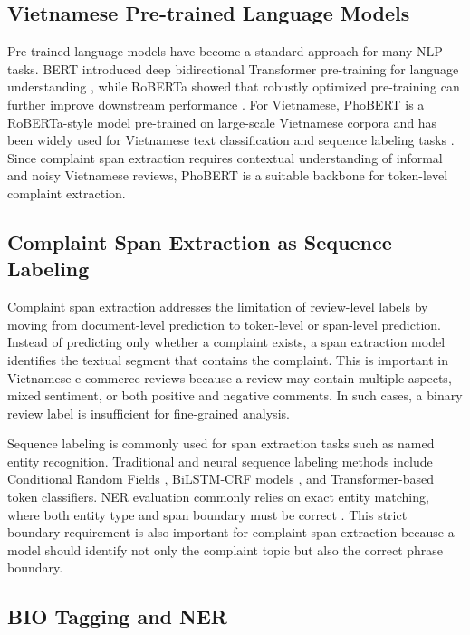 \documentclass[11pt]{article}
\begin{document}
\subsection{Vietnamese Pre-trained Language Models}

Pre-trained language models have become a standard approach for many NLP tasks. BERT introduced deep bidirectional Transformer pre-training for language understanding \citep{bert2019}, while RoBERTa showed that robustly optimized pre-training can further improve downstream performance \citep{roberta2019}. For Vietnamese, PhoBERT is a RoBERTa-style model pre-trained on large-scale Vietnamese corpora and has been widely used for Vietnamese text classification and sequence labeling tasks \citep{phobert2020}. Since complaint span extraction requires contextual understanding of informal and noisy Vietnamese reviews, PhoBERT is a suitable backbone for token-level complaint extraction.

\subsection{Complaint Span Extraction as Sequence Labeling}

Complaint span extraction addresses the limitation of review-level labels by moving from document-level prediction to token-level or span-level prediction. Instead of predicting only whether a complaint exists, a span extraction model identifies the textual segment that contains the complaint. This is important in Vietnamese e-commerce reviews because a review may contain multiple aspects, mixed sentiment, or both positive and negative comments. In such cases, a binary review label is insufficient for fine-grained analysis.

Sequence labeling is commonly used for span extraction tasks such as named entity recognition. Traditional and neural sequence labeling methods include Conditional Random Fields \citep{crf2001}, BiLSTM-CRF models \citep{huang2015bilstmcrf,lample2016neural,ma2016endtoend}, and Transformer-based token classifiers. NER evaluation commonly relies on exact entity matching, where both entity type and span boundary must be correct \citep{conll2003ner,nadeau2007survey}. This strict boundary requirement is also important for complaint span extraction because a model should identify not only the complaint topic but also the correct phrase boundary.

\subsection{BIO Tagging and NER}
\end{document}
